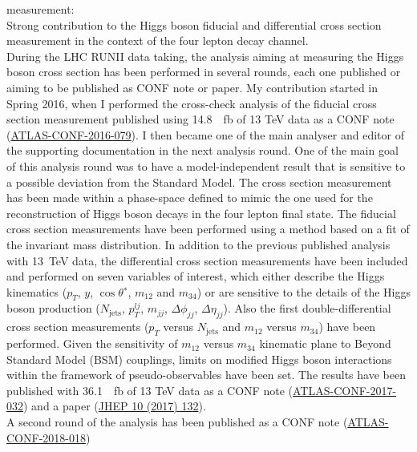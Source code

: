 \begin{cvinterests}
{\begin{itemize}[labelwidth=0.05in,align=right,leftmargin=!,labelsep=0pt,
itemsep=0.0em]
{measurement}:\\
Strong contribution to the Higgs boson fiducial and differential cross section
measurement in the context of the four lepton decay channel.\\
During the LHC RUNII data taking, the analysis aiming at measuring the Higgs
boson cross section has been performed in several rounds, each one published or
aiming to be published as CONF note or paper. My contribution started in Spring
2016, when I performed the cross-check analysis of the fiducial cross section
measurement published using \SI{14.8}{\per\femto\barn} of 13 \si{\tera\electronvolt}
data as a CONF note (\href{https://atlas.web.cern.ch/Atlas/GROUPS/PHYSICS/CONFNOTES/ATLAS-CONF-2016-079/}{ATLAS-CONF-2016-079}).
I then became one of the main analyser and editor of the supporting
documentation in the next analysis round. One of the main goal of this analysis
round was to have a model-independent result that is sensitive to a possible
deviation from the Standard Model. The cross section measurement has been
made within a phase-space defined to mimic the one used for the reconstruction
of Higgs boson decays in the four lepton final state. The fiducial cross section
measurements have been performed using a method based on a fit of the invariant
mass distribution. In addition to the previous published analysis with
\SI{13}{\tera\electronvolt} data, the differential cross section measurements
have been included and performed on seven variables of interest, which either
describe the Higgs kinematics ($p_{T}$, $y$, $\cos\theta^{∗}$, $m_{12}$ and
$m_{34}$) or are sensitive to the details of the Higgs boson production
($N_{\mathrm{jets}}$, $p_{T}^{lj}$, $m_{jj}$, $\Delta\phi_{jj}$, $\Delta\eta_{jj}$).
Also the first double-differential cross section measurements
($p_{T}$ versus $N_{\mathrm{jets}}$ and $m_{12}$ versus $m_{34}$) have been performed.
Given the sensitivity of $m_{12}$ versus $m_{34}$ kinematic plane to Beyond Standard
Model (BSM) couplings, limits on modified Higgs boson interactions within the
framework of pseudo-observables have been set. The results have been published
with \SI{36.1}{\per\femto\barn} of 13 \si{\tera\electronvolt} data as a CONF
note (\href{https://atlas.web.cern.ch/Atlas/GROUPS/PHYSICS/CONFNOTES/ATLAS-CONF-2017-032/}{ATLAS-CONF-2017-032})
and a paper (\href{https://link.springer.com/article/10.1007/JHEP10(2017)132}{JHEP 10 (2017) 132}).\\
A second round of the analysis has been published as a CONF note
(\href{https://atlas.web.cern.ch/Atlas/GROUPS/PHYSICS/CONFNOTES/ATLAS-CONF-2018-018/}{ATLAS-CONF-2018-018})

\end{itemize}}
\end{cvinterests}
